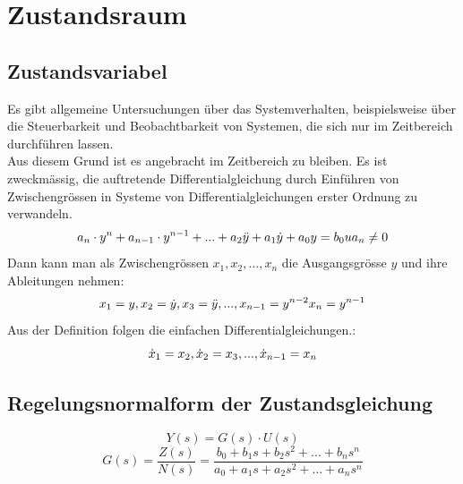 



\chapter{Zustandsraum}
\section{Zustandsvariabel}
Es gibt allgemeine Untersuchungen über das Systemverhalten, beispielsweise über die Steuerbarkeit und Beobachtbarkeit von Systemen, die sich nur im Zeitbereich durchführen lassen.\\
Aus diesem Grund ist es angebracht im Zeitbereich zu bleiben. Es ist zweckmässig, die auftretende Differentialgleichung durch Einführen von Zwischengrössen in Systeme von Differentialgleichungen erster Ordnung zu verwandeln.
\[
	a_n\cdot y^n+a_{n-1} \cdot y^{n-1}+...+a_2\ddot{y} +a_1\dot{y}+ a_0y=b_0u 
	\\ a_n\neq 0
\]
Dann kann man als Zwischengrössen $x_1,x_2,...,x_n$ die Ausgangsgrösse $y$ und ihre Ableitungen nehmen:
\[
	x_1=y,	\\	x_2=\dot{y},	\\ x_3=\ddot{y},...,	\\x_{n-1}=y^{n-2}	\\	x_n=y^{n-1}
\]
Aus der Definition folgen die einfachen Differentialgleichungen.:
\[
	\dot{x}_1=x_2,	\\	\dot{x}_2=x_3	\\,...,	\\ 	\dot{x}_{n-1}=x_n
\]
\section{Regelungsnormalform der Zustandsgleichung}
\[
	Y(s) = G(s) \cdot U(s)
\]
\[
	G(s)= \frac{Z(s)}{N(s)} = \frac{b_0+b_1s+b_2s^2+...+b_ns^n}{a_0+a_1s+a_2s^2+...+a_ns^n}
\]
